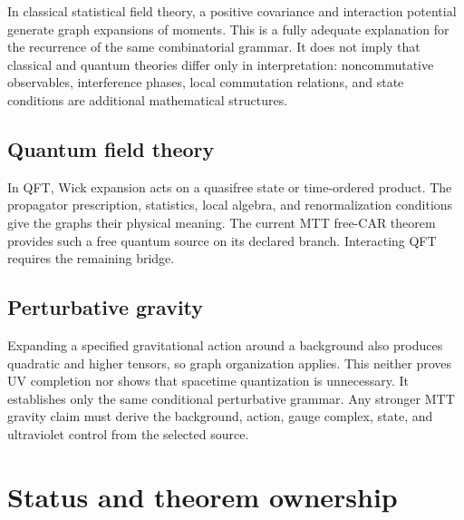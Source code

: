 \documentclass[11pt,a4paper]{article}
\begin{document}
In classical statistical field theory, a positive covariance and
interaction potential generate graph expansions of moments.  This is a
fully adequate explanation for the recurrence of the same combinatorial
grammar.  It does not imply that classical and quantum theories differ
only in interpretation: noncommutative observables, interference phases,
local commutation relations, and state conditions are additional
mathematical structures.

\subsection{Quantum field theory}

In QFT, Wick expansion acts on a quasifree state or time-ordered product.
The propagator prescription, statistics, local algebra, and
renormalization conditions give the graphs their physical meaning.  The
current MTT free-CAR theorem provides such a free quantum source on its
declared branch.  Interacting QFT requires the remaining bridge.

\subsection{Perturbative gravity}

Expanding a specified gravitational action around a background also
produces quadratic and higher tensors, so graph organization applies.
This neither proves UV completion nor shows that spacetime quantization is
unnecessary.  It establishes only the same conditional perturbative
grammar.  Any stronger MTT gravity claim must derive the background,
action, gauge complex, state, and ultraviolet control from the selected
source.

\section{Status and theorem ownership}
\end{document}
